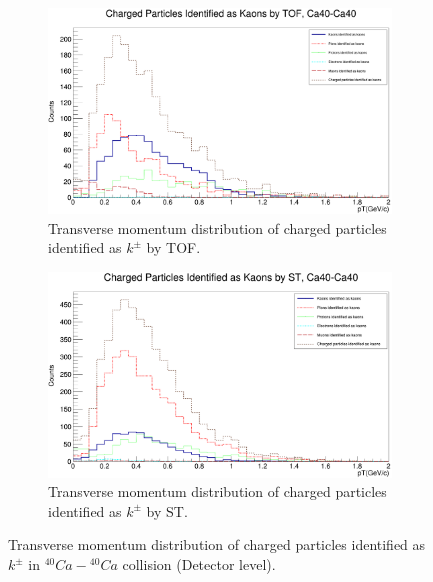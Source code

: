 \documentclass[12pt, twocolumn]{article}
\begin{document}
\begin{figure}[h]
\centering
\begin{subfigure}[h]{0.49\textwidth}
\centering
\includegraphics[scale=0.14]{Detector_pT_kaons(tof)_Ca.png}
\caption{Transverse momentum distribution of charged particles identified as $k^{\pm}$ by TOF.}
\label{Detector - Transverse momentum distribution of kaons (TOF) Ca40.}
\end{subfigure}
\hfill
\begin{subfigure}[h]{0.49\textwidth}
\centering
\includegraphics[scale=0.14]{Detector_pT_kaons(st)_Ca.png}
\caption{Transverse momentum distribution of charged particles identified as $k^{\pm}$ by ST.}
\label{Detector - Transverse momentum distribution of kaons (ST) Ca40.}
\end{subfigure}
\caption{Transverse momentum distribution of charged particles identified as $k^{\pm}$ in $^{40}Ca-{^{40}Ca}$ collision (Detector level).}
\label{Transverse momentum distribution of charged particles identified as kaons in Ca40-Ca40 collision.}
\end{figure}
\end{document}
